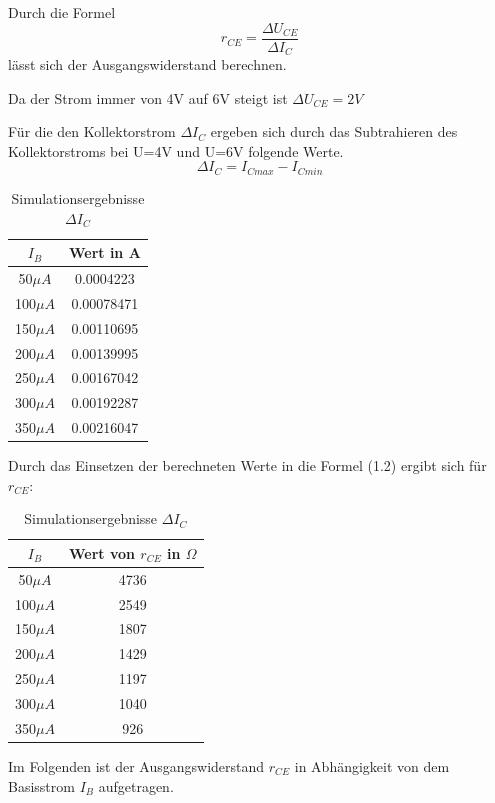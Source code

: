         Durch die Formel 
        \begin{equation}
            r_{CE}=\frac{\Delta U_{CE}} {\Delta I_C}
        \end{equation}
        lässt sich der Ausgangswiderstand berechnen.

        Da der Strom immer von 4V auf 6V steigt ist $\Delta U_{CE}= 2V$

        Für die den Kollektorstrom $\Delta I_C$ ergeben sich durch das Subtrahieren des Kollektorstroms bei U=4V und U=6V folgende Werte.
        \begin{equation}
            \Delta I_C=I_{Cmax}-I_{Cmin}
        \end{equation}

        \begin{table}[!ht]
        \centering
            \caption{Simulationsergebnisse $\Delta I_C$}
            \begin{tabular}{|c|c|}
                \hline
                \(I_B\) & Wert in A\\ \hline \hline
                50\(\mu A\) & 0.0004223 \\ \hline
                100\(\mu A\) & 0.00078471\\ \hline
                150\(\mu A\) & 0.00110695\\ \hline
                200\(\mu A\) & 0.00139995\\ \hline
                250\(\mu A\) & 0.00167042\\ \hline
                300\(\mu A\) & 0.00192287\\ \hline
                350\(\mu A\) & 0.00216047 \\ \hline
            \end{tabular}
        \end{table}

        Durch das Einsetzen der berechneten Werte in die Formel (1.2) ergibt sich für \(r_{CE}\):
        \begin{table}[!ht]
            \centering
            \caption{Simulationsergebnisse \(\Delta I_C\)}
            \begin{tabular}{|c|c|}
                \hline
                \(I_B\) & Wert von \(r_{CE}\) in \(\Omega\)\\
                \hline \hline
                50\(\mu A\) & 4736 \\ \hline
                100\(\mu A\) & 2549\\ \hline
                150\(\mu A\) & 1807\\ \hline
                200\(\mu A\) & 1429\\ \hline
                250\(\mu A\) & 1197\\ \hline
                300\(\mu A\) & 1040\\ \hline
                350\(\mu A\) & 926\\ \hline
            \end{tabular}
        \end{table}
        \newpage
        Im Folgenden ist der Ausgangswiderstand \(r_{CE}\) in Abhängigkeit von dem Basisstrom \(I_B\) aufgetragen.

